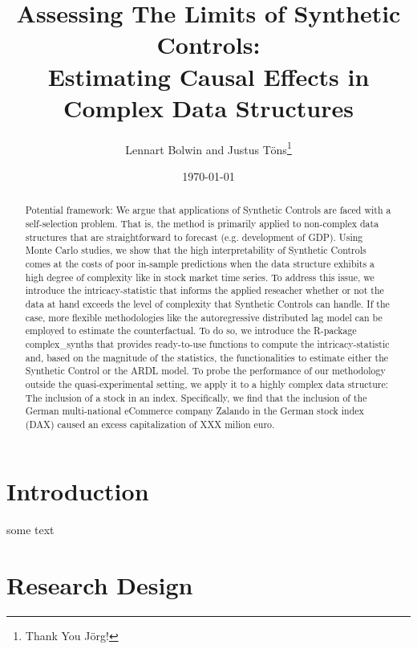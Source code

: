 \documentclass[AER]{AEA}
\begin{document}
	
	\title{Assessing The Limits of Synthetic Controls: \\ Estimating Causal Effects in Complex Data Structures}
	\shortTitle{}
	\author{Lennart Bolwin and Justus Töns\thanks{Thank You Jörg!}}
	\date{\today}
	\JEL{}
	\Keywords{}
	
	\begin{abstract}
		Potential framework: We argue that applications of Synthetic Controls are faced with a self-selection problem. That is, the method is primarily applied to non-complex data structures that are straightforward to forecast (e.g. development of GDP). Using Monte Carlo studies, we show that the high interpretability of Synthetic Controls comes at the costs of poor in-sample predictions when the data structure exhibits a high degree of complexity like in stock market time series. To address this issue, we introduce the intricacy-statistic that informs the applied reseacher whether or not the data at hand exceeds the level of complexity that Synthetic Controls can handle. If the case, more flexible methodologies like the autoregressive distributed lag model can be employed to estimate the counterfactual. To do so, we introduce the R-package complex\_synths that provides ready-to-use functions to compute the intricacy-statistic and, based on the magnitude of the statistics, the functionalities to estimate either the Synthetic Control or the ARDL model. To probe the performance of our methodology outside the quasi-experimental setting, we apply it to a highly complex data structure: The inclusion of a stock in an index. Specifically, we find that the inclusion of the German multi-national eCommerce company Zalando in the German stock index (DAX) caused an excess capitalization of XXX milion euro. 
	\end{abstract}
	
	
	\maketitle
	
	\section{Introduction}
	
	some text
	
	\section{Research Design}
	
\end{document}
